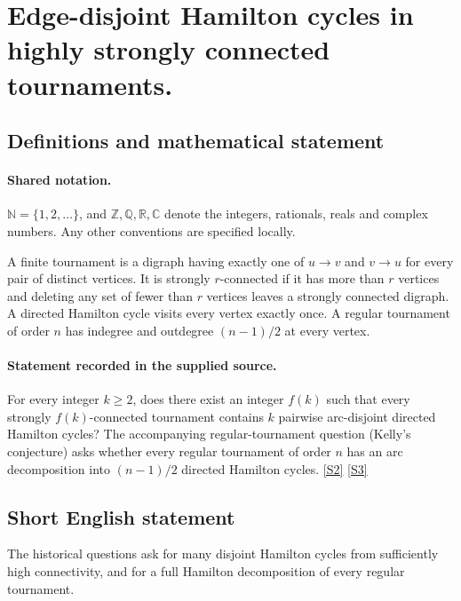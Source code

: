 \documentclass[11pt]{article}
\newcommand{\sref}[2]{\hyperlink{source:#1:#2}{[S#2]}}
\begin{document}
\section{Edge-disjoint Hamilton cycles in highly strongly connected tournaments.}\label{statement}

\subsection{Definitions and mathematical statement}

\paragraph{Shared notation.}$\mathbb N=\{1,2,\ldots\}$, and $\mathbb Z,\mathbb Q,\mathbb R,\mathbb C$ denote the integers, rationals, reals and complex numbers. Any other conventions are specified locally.


A finite tournament is a digraph having exactly one of $u\to v$ and $v\to u$ for every pair of distinct vertices. It is strongly $r$-connected if it has more than $r$ vertices and deleting any set of fewer than $r$ vertices leaves a strongly connected digraph. A directed Hamilton cycle visits every vertex exactly once. A regular tournament of order $n$ has indegree and outdegree $(n-1)/2$ at every vertex.
\paragraph{Statement recorded in the supplied source.}
For every integer $k\geq2$, does there exist an integer $f(k)$ such that every strongly $f(k)$-connected tournament contains $k$ pairwise arc-disjoint directed Hamilton cycles? The accompanying regular-tournament question (Kelly's conjecture) asks whether every regular tournament of order $n$ has an arc decomposition into $(n-1)/2$ directed Hamilton cycles. \sref{statement}{2} \sref{statement}{3}
\subsection{Short English statement}
The historical questions ask for many disjoint Hamilton cycles from sufficiently high connectivity, and for a full Hamilton decomposition of every regular tournament.
\end{document}
